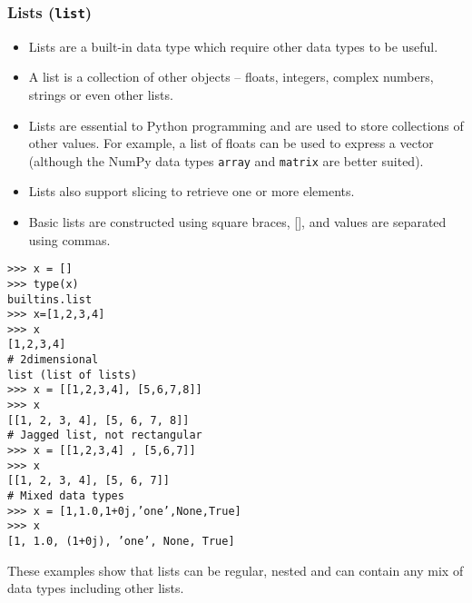 \documentclass[Pydata.tex]{subfiles}
\begin{document}
\subsubsection{Lists (\texttt{list})}
\begin{itemize}
\item Lists are a built-in data type which require other data types to be useful. 
\item A list is a collection of other objects
– floats, integers, complex numbers, strings or even other lists. 
\item Lists are essential to Python programming
and are used to store collections of other values. For example, a list of floats can be used to express a vector
(although the NumPy data types \texttt{array} and \texttt{matrix} are better suited). 
\item Lists also support slicing to retrieve
one or more elements. 
\item Basic lists are constructed using square braces, [], and values are separated using
commas.
\end{itemize}
\begin{framed}
\begin{verbatim}
>>> x = []
>>> type(x)
builtins.list
>>> x=[1,2,3,4]
>>> x
[1,2,3,4]
# 2dimensional
list (list of lists)
>>> x = [[1,2,3,4], [5,6,7,8]]
>>> x
[[1, 2, 3, 4], [5, 6, 7, 8]]
# Jagged list, not rectangular
>>> x = [[1,2,3,4] , [5,6,7]]
>>> x
[[1, 2, 3, 4], [5, 6, 7]]
# Mixed data types
>>> x = [1,1.0,1+0j,’one’,None,True]
>>> x
[1, 1.0, (1+0j), ’one’, None, True]
\end{verbatim}
\end{framed}
These examples show that lists can be regular, nested and can contain any mix of data types including
other lists.

\newpage
\end{document}
